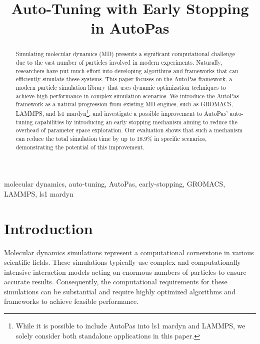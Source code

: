 \documentclass[conference]{IEEEtran}
\begin{document}
\title{Auto-Tuning with Early Stopping in AutoPas}

\author{
}

\maketitle

\begin{abstract}
    Simulating molecular dynamics (MD) presents a significant computational challenge due to the vast number of particles involved in modern experiments. Naturally, researchers have put much effort into developing algorithms and frameworks that can efficiently simulate these systems. This paper focuses on the AutoPas framework, a modern particle simulation library that uses dynamic optimization techniques to achieve high performance in complex simulation scenarios. We introduce the AutoPas framework as a natural progression from existing MD engines, such as GROMACS, LAMMPS, and ls1 mardyn\footnote{
        While it is possible to include AutoPas into ls1 mardyn and LAMMPS, we solely consider both standalone applications in this paper.
    }, and investigate a possible improvement to AutoPas' auto-tuning capabilities by introducing an early stopping mechanism aiming to reduce the overhead of parameter space exploration. Our evaluation shows that such a mechanism can reduce the total simulation time by up to 18.9\% in specific scenarios, demonstrating the potential of this improvement.
\end{abstract}

\begin{IEEEkeywords}
    molecular dynamics, auto-tuning, AutoPas, early-stopping, GROMACS, LAMMPS, ls1 mardyn
\end{IEEEkeywords}

\section{Introduction}

Molecular dynamics simulations represent a computational cornerstone in various scientific fields. These simulations typically use complex and computationally intensive interaction models acting on enormous numbers of particles to ensure accurate results. Consequently, the computational requirements for these simulations can be substantial and require highly optimized algorithms and frameworks to achieve feasible performance.
\end{document}
